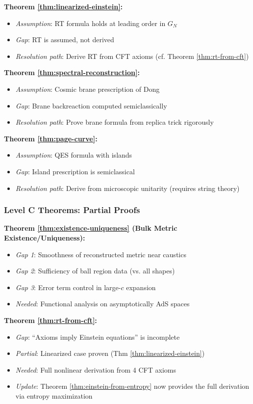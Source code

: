 \documentclass[12pt,a4paper]{article}
\begin{document}
\textbf{Theorem \ref{thm:linearized-einstein}:}
\begin{itemize}
    \item \textit{Assumption}: RT formula holds at leading order in $G_N$
    \item \textit{Gap}: RT is assumed, not derived
    \item \textit{Resolution path}: Derive RT from CFT axioms (cf. Theorem \ref{thm:rt-from-cft})
\end{itemize}

\textbf{Theorem \ref{thm:spectral-reconstruction}:}
\begin{itemize}
    \item \textit{Assumption}: Cosmic brane prescription of Dong \cite{dong2016}
    \item \textit{Gap}: Brane backreaction computed semiclassically
    \item \textit{Resolution path}: Prove brane formula from replica trick rigorously
\end{itemize}

\textbf{Theorem \ref{thm:page-curve}:}
\begin{itemize}
    \item \textit{Assumption}: QES formula with islands
    \item \textit{Gap}: Island prescription is semiclassical
    \item \textit{Resolution path}: Derive from microscopic unitarity (requires string theory)
\end{itemize}

\subsubsection{Level C Theorems: Partial Proofs}

\textbf{Theorem \ref{thm:existence-uniqueness} (Bulk Metric Existence/Uniqueness):}
\begin{itemize}
    \item \textit{Gap 1}: Smoothness of reconstructed metric near caustics
    \item \textit{Gap 2}: Sufficiency of ball region data (vs. all shapes)
    \item \textit{Gap 3}: Error term control in large-$c$ expansion
    \item \textit{Needed}: Functional analysis on asymptotically AdS spaces
\end{itemize}

\textbf{Theorem \ref{thm:rt-from-cft}:}
\begin{itemize}
    \item \textit{Gap}: ``Axioms imply Einstein equations'' is incomplete
    \item \textit{Partial}: Linearized case proven (Thm \ref{thm:linearized-einstein})
    \item \textit{Needed}: Full nonlinear derivation from 4 CFT axioms
    \item \textit{Update}: Theorem \ref{thm:einstein-from-entropy} now provides the full derivation via entropy maximization
\end{itemize}
\end{document}
